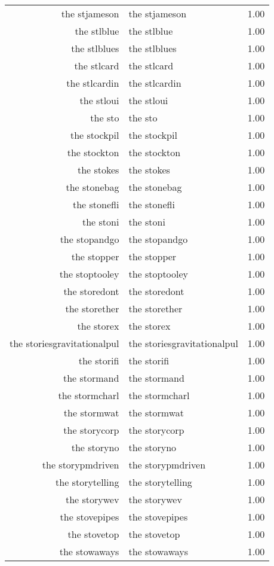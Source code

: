 \begin{table}[ht]
\begin{tabular}{rlr}
  the stjameson & the stjameson & 1.00 \\ 
  the stlblue & the stlblue & 1.00 \\ 
  the stlblues & the stlblues & 1.00 \\ 
  the stlcard & the stlcard & 1.00 \\ 
  the stlcardin & the stlcardin & 1.00 \\ 
  the stloui & the stloui & 1.00 \\ 
  the sto & the sto & 1.00 \\ 
  the stockpil & the stockpil & 1.00 \\ 
  the stockton & the stockton & 1.00 \\ 
  the stokes & the stokes & 1.00 \\ 
  the stonebag & the stonebag & 1.00 \\ 
  the stonefli & the stonefli & 1.00 \\ 
  the stoni & the stoni & 1.00 \\ 
  the stopandgo & the stopandgo & 1.00 \\ 
  the stopper & the stopper & 1.00 \\ 
  the stoptooley & the stoptooley & 1.00 \\ 
  the storedont & the storedont & 1.00 \\ 
  the storether & the storether & 1.00 \\ 
  the storex & the storex & 1.00 \\ 
  the storiesgravitationalpul & the storiesgravitationalpul & 1.00 \\ 
  the storifi & the storifi & 1.00 \\ 
  the stormand & the stormand & 1.00 \\ 
  the stormcharl & the stormcharl & 1.00 \\ 
  the stormwat & the stormwat & 1.00 \\ 
  the storycorp & the storycorp & 1.00 \\ 
  the storyno & the storyno & 1.00 \\ 
  the storypmdriven & the storypmdriven & 1.00 \\ 
  the storytelling & the storytelling & 1.00 \\ 
  the storywev & the storywev & 1.00 \\ 
  the stovepipes & the stovepipes & 1.00 \\ 
  the stovetop & the stovetop & 1.00 \\ 
  the stowaways & the stowaways & 1.00 \\ 

\end{tabular}
\end{table}
